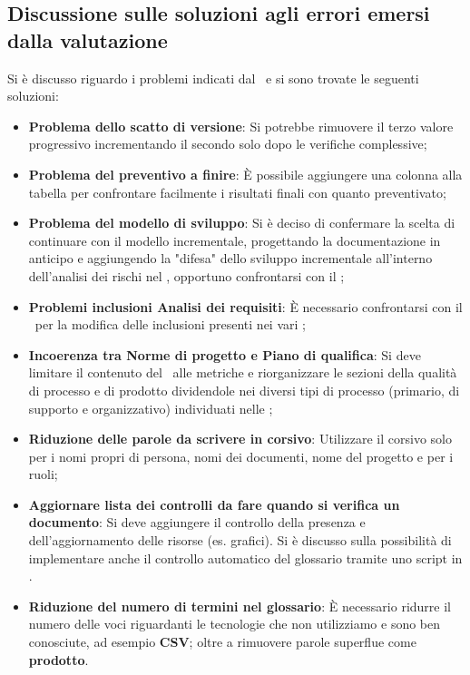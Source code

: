 \subsection{Discussione sulle soluzioni agli errori emersi dalla valutazione }
Si è discusso riguardo i problemi indicati dal \VT\ e si sono trovate le seguenti soluzioni:
\begin{itemize}
	\item \textbf{Problema dello scatto di versione}: Si potrebbe rimuovere il terzo valore progressivo incrementando il secondo solo dopo le verifiche complessive;
	\item \textbf{Problema del preventivo a finire}: È possibile aggiungere una colonna alla tabella per confrontare facilmente i risultati finali con quanto preventivato;
	\item \textbf{Problema del modello di sviluppo}: Si è deciso di confermare la scelta di continuare con il modello incrementale, progettando la documentazione in anticipo e aggiungendo la "difesa" dello sviluppo incrementale all'interno dell'analisi dei rischi nel \PdP, opportuno confrontarsi con il \VT;
	\item \textbf{Problemi inclusioni Analisi dei requisiti}: È necessario confrontarsi con il \CR\ per la modifica delle inclusioni presenti nei vari ;
	\item \textbf{Incoerenza tra Norme di progetto e Piano di qualifica}: Si deve limitare il contenuto del \PdQ\ alle metriche e riorganizzare le sezioni della qualità di processo e di prodotto dividendole nei diversi tipi di processo (primario, di supporto e organizzativo) individuati nelle \NdP;
	\item \textbf{Riduzione delle parole da scrivere in corsivo}: Utilizzare il corsivo solo per i nomi propri di persona, nomi dei documenti, nome del progetto e per i ruoli;
	\item \textbf{Aggiornare lista dei controlli da fare quando si verifica un documento}: Si deve aggiungere il controllo della presenza e dell'aggiornamento delle risorse (es. grafici). Si è discusso sulla possibilità di implementare anche il controllo automatico del glossario tramite uno script in .
	\item \textbf{Riduzione del numero di termini nel glossario}: È necessario ridurre il numero delle voci riguardanti le tecnologie che non utilizziamo e sono ben conosciute, ad esempio \textbf{CSV}; oltre a rimuovere parole superflue come \textbf{prodotto}.
\end{itemize}
